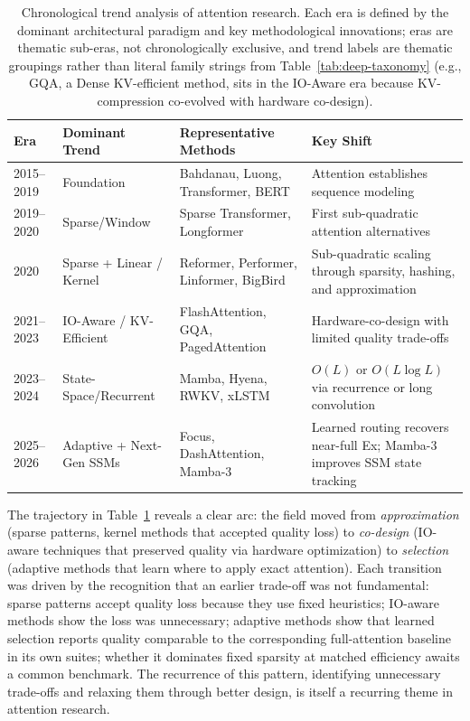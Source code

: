\documentclass[10pt,twocolumn]{article}
\begin{document}
\begin{table}[!tbp]
\centering
\footnotesize
\renewcommand{\arraystretch}{1.15}
\caption{Chronological trend analysis of attention research. Each era is defined by the dominant architectural paradigm and key methodological innovations; eras are thematic sub-eras, not chronologically exclusive, and trend labels are thematic groupings rather than literal family strings from Table~\ref{tab:deep-taxonomy} (e.g., GQA, a Dense KV-efficient method, sits in the IO-Aware era because KV-compression co-evolved with hardware co-design).}
\label{tab:trends}
\begin{tabular}{p{1.6cm} p{2.0cm} p{3.0cm} p{3.5cm}}
\toprule
Era & Dominant Trend & Representative Methods & Key Shift \\
\midrule
2015--2019 & Foundation & Bahdanau, Luong, Transformer, BERT & Attention establishes sequence modeling \\
2019--2020 & Sparse/Window & Sparse Transformer, Longformer & First sub-quadratic attention alternatives \\
2020 & Sparse + Linear / Kernel & Reformer, Performer, Linformer, BigBird & Sub-quadratic scaling through sparsity, hashing, and approximation \\
2021--2023 & IO-Aware / KV-Efficient & FlashAttention, GQA, PagedAttention & Hardware-co-design with limited quality trade-offs \\
2023--2024 & State-Space/Recurrent & Mamba, Hyena, RWKV, xLSTM & $O(L)$ or $O(L \log L)$ via recurrence or long convolution \\
2025--2026 & Adaptive + Next-Gen SSMs & Focus, DashAttention, Mamba-3 & Learned routing recovers near-full Ex; Mamba-3 improves SSM state tracking \\
\bottomrule
\end{tabular}
\end{table}

The trajectory in Table~\ref{tab:trends} reveals a clear arc: the field moved from \textit{approximation} (sparse patterns, kernel methods that accepted quality loss) to \textit{co-design} (IO-aware techniques that preserved quality via hardware optimization) to \textit{selection} (adaptive methods that learn where to apply exact attention). Each transition was driven by the recognition that an earlier trade-off was not fundamental: sparse patterns accept quality loss because they use fixed heuristics; IO-aware methods show the loss was unnecessary; adaptive methods show that learned selection reports quality comparable to the corresponding full-attention baseline in its own suites; whether it dominates fixed sparsity at matched efficiency awaits a common benchmark. The recurrence of this pattern, identifying unnecessary trade-offs and relaxing them through better design, is itself a recurring theme in attention research.
\end{document}
